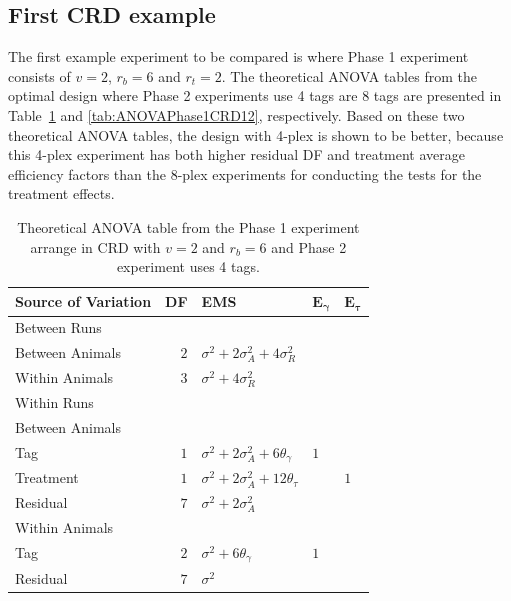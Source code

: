 \documentclass[12pt,a4paper]{article}
\begin{document}
\subsection{First CRD example}
The first example experiment to be compared is where Phase 1 experiment consists of $v = 2$, $r_b = 6$ and $r_t = 2$. The theoretical ANOVA tables from the optimal design where Phase 2 experiments use 4 tags are 8 tags are presented in Table~\ref{tab:ANOVAPhase1CRD11} and \ref{tab:ANOVAPhase1CRD12}, respectively. 
Based on these two theoretical ANOVA tables, the design with 4-plex is shown to be better, because this 4-plex experiment has both higher residual DF and treatment average efficiency factors than the 8-plex experiments for conducting the tests for the treatment effects. 

\begin{table}[ht]
\centering
 \caption{Theoretical ANOVA table from the Phase 1 experiment arrange in CRD with $v = 2$ and $r_b = 6$ and Phase 2 experiment uses 4 tags.}
 \begin{tabular}[t]{lrlll} 
 \toprule 
 \multicolumn{1}{l}{\textbf{Source of Variation}} & \multicolumn{1}{l}{\textbf{DF}} & \multicolumn{1}{l}{\textbf{EMS}}& \multicolumn{1}{l}{$\bm{E_{\gamma}}$}&\multicolumn{1}{l}{$\bm{E_{\tau}}$}\\ 
 \midrule 
 Between Runs &  &  & & \\ 
 \quad Between Animals & $2$ & $\sigma^2+2\sigma_{A}^2+4\sigma_{R}^2$ & & \\  \quad Within Animals & $3$ & $\sigma^2+4\sigma_{R}^2$ & & \\ \hline 
 Within Runs &  &  & & \\ 
 \quad Between Animals &  &  & & \\ 
 \quad \quad Tag & $1$ & $\sigma^2+2\sigma_{A}^2+6\theta_{\gamma}$ &$1$ & \\ 
 \quad \quad Treatment & $1$ & $\sigma^2+2\sigma_{A}^2+12\theta_{\tau}$ & & $1$\\ 
 \quad \quad Residual & $7$ & $\sigma^2+2\sigma_{A}^2$ & & \\ \hline 
 \quad Within Animals &  &  & & \\ 
 \quad \quad Tag & $2$ & $\sigma^2+6\theta_{\gamma}$ &$1$ & \\ 
 \quad \quad Residual & $7$ & $\sigma^2$ & & \\ 
 \bottomrule 
 \end{tabular} 
 \label{tab:ANOVAPhase1CRD11} 
\end{table} 
\end{document}
